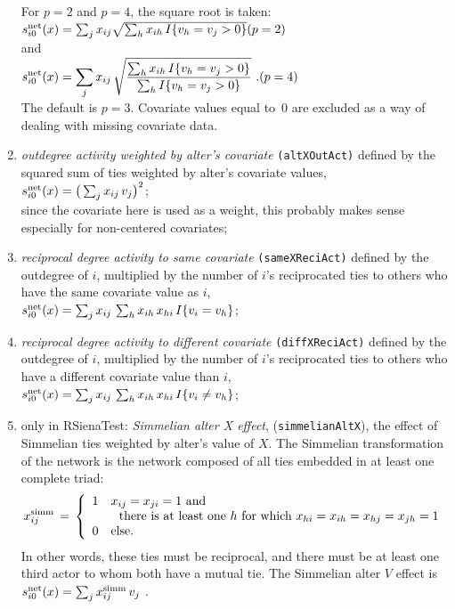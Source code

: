 \documentclass[a4paper,fleqn,11pt]{article}
\newcommand{\+}{\, + \,}
\newcommand{\vit}{\theenumi}
\begin{document}
\begin{enumerate}
 For $p=2$ and $p=4$, the square root is taken: \\[0.5em]
 $s^{\rm net}_{i\vit}(x) = \sum_j x_{ij} \sqrt{\sum_h x_{ih} \,I\{v_h = v_j > 0\}}
                 \hfill (p=2)$\\[0.3em]
 and \\[0.3em]
 $\displaystyle s^{\rm net}_{i\vit}(x) =  \sum_j x_{ij}\, \sqrt{ \frac{ \sum_{h} x_{ih}\, I\{v_h = v_j > 0 \}}
            { \sum_{h} I\{v_h = v_j > 0 \}}}  \ . \hfill (p=4)$\\[0.3em]

The default is $p=3$.
Covariate values equal to~0 are excluded as a way of dealing with missing covariate data.


 \item {\em outdegree activity weighted by alter's covariate}
  \texttt{(altXOutAct)} defined by the
 squared sum of ties weighted by alter's covariate values,\\
 $s^{\rm net}_{i\vit}(x) = \big(\sum_j x_{ij} \,v_j \big)^2 $;\\
 since the covariate here is used as a weight, this probably
 makes sense especially for non-centered covariates;


 \item {\em reciprocal degree activity to same covariate}
\texttt{(sameXReciAct)} defined by the outdegree of $i$,
 multiplied by the number of $i$'s reciprocated ties
 to others who have the same covariate value as $i$,\\
 $s^{\rm net}_{i\vit}(x) =  \sum_j x_{ij}\,
                \sum_h x_{ih}\,x_{hi}\, I\{v_i = v_h \} $;

 \item {\em reciprocal degree activity to different covariate}
\texttt{(diffXReciAct)} defined by the outdegree of $i$,
 multiplied by the number of $i$'s reciprocated ties
 to others who have a different covariate value than $i$,\\
 $s^{\rm net}_{i\vit}(x) =  \sum_j x_{ij}\,
                \sum_h x_{ih}\,x_{hi}\, I\{v_i \neq v_h \} $;


\item only in \textsf{RSienaTest}:  \emph{Simmelian alter X effect}, (\texttt{simmelianAltX}), the effect of
      Simmelian ties weighted by alter's value of $X$. The Simmelian transformation of the network is
      the network composed of all ties embedded in at least one complete triad:
\[
    x^{\rm{simm}}_{ij} \,=\, \left\{ \begin{array}{cl}
                               1 & x_{ij} = x_{ji} = 1 \text{ and} \\
                                  & \ \text{ there is at least one }
                                      h \text{ for which } x_{hi} = x_{ih} = x_{hj} = x_{jh} = 1 \\
                               0 & \text{else.}
                             \end{array} \right.
\]
      In other words, these ties must be reciprocal, and there must be at least one
      third actor to whom both have a mutual tie.
      The Simmelian alter $V$ effect  is  \\
$s^{\rm net}_{i\vit}(x ) = \sum_j  x^{\rm{simm}}_{ij}\,v_j $ .



\end{enumerate}
\end{document}
